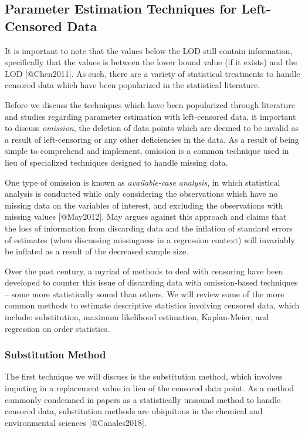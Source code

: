\documentclass[
]{article}
\begin{document}
\hypertarget{Approaches}{%
\subsection{Parameter Estimation Techniques for Left-Censored
Data}\label{Approaches}}

It is important to note that the values below the LOD still contain
information, specifically that the values is between the lower bound
value (if it exists) and the LOD {[}@Chen2011{]}. As such, there are a
variety of statistical treatments to handle censored data which have
been popularized in the statistical literature.

Before we discuss the techniques which have been popularized through
literature and studies regarding parameter estimation with left-censored
data, it important to discuss \emph{omission}, the deletion of data
points which are deemed to be invalid as a result of left-censoring or
any other deficiencies in the data. As a result of being simple to
comprehend and implement, omission is a common technique used in lieu of
specialized techniques designed to handle missing data.

One type of omission is known as \emph{available-case analysis}, in
which statistical analysis is conducted while only considering the
observations which have no missing data on the variables of interest,
and excluding the observations with missing values {[}@May2012{]}. May
argues against this approach and claims that the loss of information
from discarding data and the inflation of standard errors of estimates
(when discussing missingness in a regression context) will invariably be
inflated as a result of the decreased sample size.

Over the past century, a myriad of methods to deal with censoring have
been developed to counter this issue of discarding data with
omission-based techniques -- some more statistically sound than others.
We will review some of the more common methods to estimate descriptive
statistics involving censored data, which include: substitution, maximum
likelihood estimation, Kaplan-Meier, and regression on order statistics.

\hypertarget{Substitution}{%
\subsubsection{Substitution Method}\label{Substitution}}

The first technique we will discuss is the substitution method, which
involves imputing in a replacement value in lieu of the censored data
point. As a method commonly condemned in papers as a statistically
unsound method to handle censored data, substitution methods are
ubiquitous in the chemical and environmental sciences
{[}@Canales2018{]}.
\end{document}
